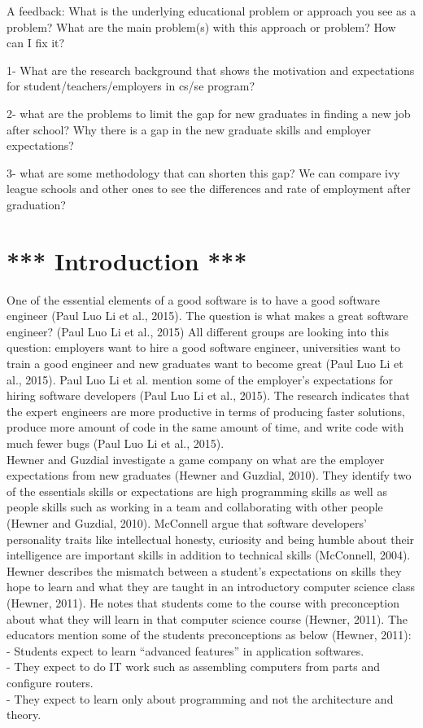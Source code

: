\documentclass{sigchi}
\begin{document}
A feedback:
What is the underlying educational problem or approach you see as a problem?  What are the main problem(s) with this approach or problem?  How can I fix it?

1- What are the research background that shows the motivation and expectations for student/teachers/employers in cs/se program?

2- what are the problems to limit the gap for new graduates in finding a new job after school? Why there is a gap in the new graduate skills and employer expectations?

3- what are some methodology that can shorten this gap? We can compare ivy league schools and other ones to see the differences and rate of employment after graduation?


\section{*** Introduction ***} 

One of the essential elements of a good software is to have a good software engineer (Paul Luo Li et al., 2015). The question is what makes a great software engineer? (Paul Luo Li et al., 2015) All different groups are looking into this question: employers want to hire a good software engineer, universities want to train a good engineer and new graduates want to become great (Paul Luo Li et al., 2015). Paul Luo Li et al. mention some of the employer’s expectations for hiring software developers (Paul Luo Li et al., 2015). The research indicates that the expert engineers are more productive in terms of producing faster solutions, produce more amount of code in the same amount of time, and write code with much fewer bugs (Paul Luo Li et al., 2015).\\ 
Hewner and Guzdial investigate a game company on what are the employer expectations from new graduates (Hewner and Guzdial, 2010). They identify two of the essentials skills or expectations are high programming skills as well as people skills such as working in a team and collaborating with other people (Hewner and Guzdial, 2010). McConnell argue that software developers’ personality traits like intellectual honesty, curiosity and being humble about their intelligence are important skills in addition to technical skills (McConnell, 2004). Hewner describes the mismatch between a student’s expectations on skills they hope to learn and what they are taught in an introductory computer science class (Hewner, 2011). He notes that students come to the course with preconception about what they will learn in that computer science course (Hewner, 2011). The educators mention some of the students preconceptions as below (Hewner, 2011):\\
	- Students expect to learn “advanced features” in application softwares.\\
	- They expect to do IT work such as assembling computers from parts and configure routers.\\
	- They expect to learn only about programming and not the architecture and theory.\\
\end{document}
